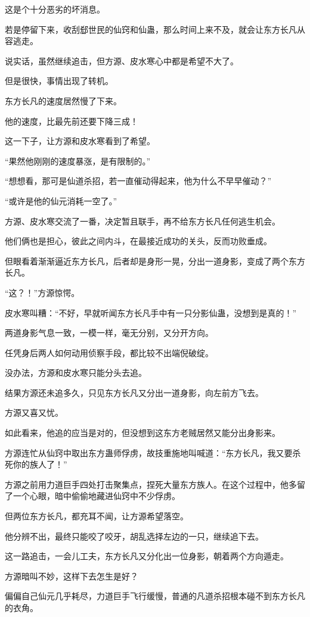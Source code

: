 \begin{this_body}
这是个十分恶劣的坏消息。

若是停留下来，收刮郄世民的仙窍和仙蛊，那么时间上来不及，就会让东方长凡从容逃走。

说实话，虽然继续追击，但方源、皮水寒心中都是希望不大了。

但是很快，事情出现了转机。

东方长凡的速度居然慢了下来。

他的速度，比最先前还要下降三成！

这一下子，让方源和皮水寒看到了希望。

“果然他刚刚的速度暴涨，是有限制的。”

“想想看，那可是仙道杀招，若一直催动得起来，他为什么不早早催动？”

“或许是他的仙元消耗一空了。”

方源、皮水寒交流了一番，决定暂且联手，再不给东方长凡任何逃生机会。

他们俩也是担心，彼此之间内斗，在最接近成功的关头，反而功败垂成。

但眼看着渐渐逼近东方长凡，后者却是身形一晃，分出一道身影，变成了两个东方长凡。

“这？！”方源惊愕。

皮水寒叫糟：“不好，早就听闻东方长凡手中有一只分影仙蛊，没想到是真的！”

两道身影气息一致，一模一样，毫无分别，又分开方向。

任凭身后两人如何动用侦察手段，都比较不出端倪破绽。

没办法，方源和皮水寒只能分头去追。

结果方源还未追多久，只见东方长凡又分出一道身影，向左前方飞去。

方源又喜又忧。

如此看来，他追的应当是对的，但没想到这东方老贼居然又能分出身影来。

方源连忙从仙窍中取出东方蛊师俘虏，故技重施地叫喊道：“东方长凡，我又要杀死你的族人了！”

方源之前用力道巨手四处打击聚集点，捏死大量东方族人。在这个过程中，他多留了一个心眼，暗中偷偷地藏进仙窍中不少俘虏。

但两位东方长凡，都充耳不闻，让方源希望落空。

他分辨不出，最终只能咬了咬牙，胡乱选择左边的一只，继续追下去。

这一路追击，一会儿工夫，东方长凡又分化出一位身影，朝着两个方向遁走。

方源暗叫不妙，这样下去怎生是好？

偏偏自己仙元几乎耗尽，力道巨手飞行缓慢，普通的凡道杀招根本碰不到东方长凡的衣角。

\end{this_body}

